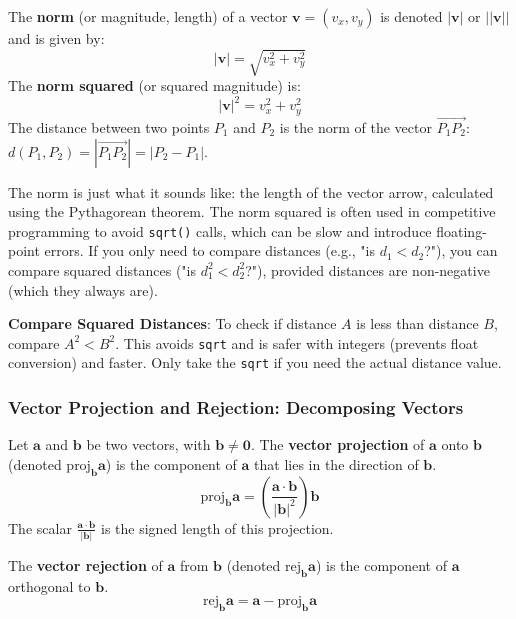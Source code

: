 \begin{definition}
\label{def:A.1.1.norm}
The \textbf{norm} (or magnitude, length) of a vector $\mathbf{v}=(v_x, v_y)$ is denoted $|\mathbf{v}|$ or $||\mathbf{v}||$ and is given by:
$$ |\mathbf{v}| = \sqrt{v_x^2 + v_y^2} $$
The \textbf{norm squared} (or squared magnitude) is:
$$ |\mathbf{v}|^2 = v_x^2 + v_y^2 $$
The distance between two points $P_1$ and $P_2$ is the norm of the vector $\vec{P_1P_2}$: $d(P_1, P_2) = |\vec{P_1P_2}| = |P_2 - P_1|$.
\end{definition}

\begin{intuition}
\label{intuition:A.1.1.norm}
The norm is just what it sounds like: the length of the vector arrow, calculated using the Pythagorean theorem.
The norm squared is often used in competitive programming to avoid \texttt{sqrt()} calls, which can be slow and introduce floating-point errors. If you only need to compare distances (e.g., "is $d_1 < d_2$?"), you can compare squared distances ("is $d_1^2 < d_2^2$?"), provided distances are non-negative (which they always are).
\end{intuition}

\begin{tipsbox}
\label{tips:A.1.1.norm_sq_compare}
\textbf{Compare Squared Distances}: To check if distance $A$ is less than distance $B$, compare $A^2 < B^2$. This avoids \texttt{sqrt} and is safer with integers (prevents float conversion) and faster. Only take the \texttt{sqrt} if you need the actual distance value.
\end{tipsbox}

\subsubsection{Vector Projection and Rejection: Decomposing Vectors}
\label{sssec:A.1.1.6}

\begin{definition}
\label{def:A.1.1.projection_rejection}
Let $\mathbf{a}$ and $\mathbf{b}$ be two vectors, with $\mathbf{b} \neq \mathbf{0}$.
The \textbf{vector projection} of $\mathbf{a}$ onto $\mathbf{b}$ (denoted $\text{proj}_{\mathbf{b}} \mathbf{a}$) is the component of $\mathbf{a}$ that lies in the direction of $\mathbf{b}$.
$$ \text{proj}_{\mathbf{b}} \mathbf{a} = \left(\frac{\mathbf{a} \cdot \mathbf{b}}{|\mathbf{b}|^2}\right) \mathbf{b} $$
The scalar $\frac{\mathbf{a} \cdot \mathbf{b}}{|\mathbf{b}|}$ is the signed length of this projection.

The \textbf{vector rejection} of $\mathbf{a}$ from $\mathbf{b}$ (denoted $\text{rej}_{\mathbf{b}} \mathbf{a}$) is the component of $\mathbf{a}$ orthogonal to $\mathbf{b}$.
$$ \text{rej}_{\mathbf{b}} \mathbf{a} = \mathbf{a} - \text{proj}_{\mathbf{b}} \mathbf{a} $$
\end{definition}

